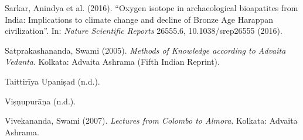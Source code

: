 \begin{thebibliography}{99}
Sarkar, Anindya et al. (2016). ``Oxygen isotope in archaeological bioapatites from India: Implications to climate change and decline of Bronze Age Harappan civilization''. In: {\sl Nature Scientific Reports} 26555.6, 10.1038/srep26555 (2016).

Satprakashananda, Swami (2005). {\sl Methods of Knowledge according to Advaita Vedanta}. Kolkata: Advaita Ashrama (Fifth Indian Reprint).

Taittirīya Upaniṣad (n.d.).

Viṣṇupurāṇa (n.d.).

Vivekananda, Swami (2007). {\sl Lectures from Colombo to Almora}. Kolkata: Advaita Ashrama.
\end{thebibliography}


\theendnotes


